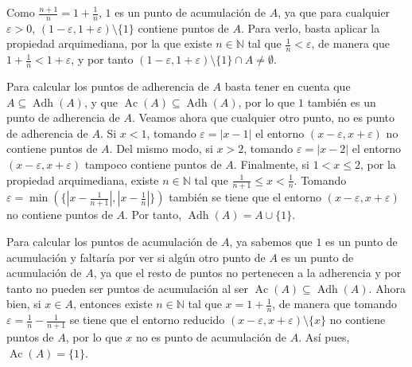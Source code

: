 \documentclass[
  spanish,
  a4paper,
]{scrreport}
\theoremstyle{definition}
\theoremstyle{remark}
\begin{document}
\begin{tcolorbox}[enhanced jigsaw, arc=.35mm, bottomrule=.15mm, bottomtitle=1mm, breakable, colback=white, colbacktitle=quarto-callout-tip-color!10!white, colframe=quarto-callout-tip-color-frame, coltitle=black, left=2mm, leftrule=.75mm, opacityback=0, opacitybacktitle=0.6, rightrule=.15mm, title=\textcolor{quarto-callout-tip-color}{\faLightbulb}\hspace{0.5em}{Solución}, titlerule=0mm, toprule=.15mm, toptitle=1mm]

Como \(\frac{n+1}{n}=1+\frac{1}{n}\), \(1\) es un punto de acumulación
de \(A\), ya que para cualquier \(\varepsilon>0\),
\((1-\varepsilon, 1+\varepsilon)\setminus  \{1\}\) contiene puntos de
\(A\). Para verlo, basta aplicar la propiedad arquimediana, por la que
existe \(n\in\mathbb{N}\) tal que \(\frac{1}{n}<\varepsilon\), de manera
que \(1+\frac{1}{n}<1+\varepsilon\), y por tanto
\((1-\varepsilon, 1+\varepsilon)\setminus  \{1\}\cap A\neq \emptyset\).

Para calcular los puntos de adherencia de \(A\) basta tener en cuenta
que \(A\subseteq \operatorname{Adh}(A)\), y que
\(\operatorname{Ac}(A)\subseteq \operatorname{Adh}(A)\), por lo que
\(1\) también es un punto de adherencia de \(A\). Veamos ahora que
cualquier otro punto, no es punto de adherencia de \(A\). Si \(x<1\),
tomando \(\varepsilon=|x-1|\) el entorno
\((x-\varepsilon, x+\varepsilon)\) no contiene puntos de \(A\). Del
mismo modo, si \(x>2\), tomando \(\varepsilon=|x-2|\) el entorno
\((x-\varepsilon, x+\varepsilon)\) tampoco contiene puntos de \(A\).
Finalmente, si \(1<x\leq 2\), por la propiedad arquimediana, existe
\(n\in\mathbb{N}\) tal que \(\frac{1}{n+1}\leq x<\frac{1}{n}\). Tomando
\(\varepsilon=\min(\{|x-\frac{1}{n+1}|,|x-\frac{1}{n}|\})\) también se
tiene que el entorno \((x-\varepsilon, x+\varepsilon)\) no contiene
puntos de \(A\). Por tanto, \(\operatorname{Adh}(A)=A\cup \{1\}\).

Para calcular los puntos de acumulación de \(A\), ya sabemos que \(1\)
es un punto de acumulación y faltaría por ver si algún otro punto de
\(A\) es un punto de acumulación de \(A\), ya que el resto de puntos no
pertenecen a la adherencia y por tanto no pueden ser puntos de
acumulación al ser
\(\operatorname{Ac}(A)\subseteq\operatorname{Adh}(A)\). Ahora bien, si
\(x\in A\), entonces existe \(n\in\mathbb{N}\) tal que
\(x=1+\frac{1}{n}\), de manera que tomando
\(\varepsilon=\frac{1}{n}-\frac{1}{n+1}\) se tiene que el entorno
reducido \((x-\varepsilon,x+\varepsilon)\setminus\{x\}\) no contiene
puntos de \(A\), por lo que \(x\) no es punto de acumulación de \(A\).
Así pues, \(\operatorname{Ac}(A)=\{1\}\).

\end{tcolorbox}
\end{document}
